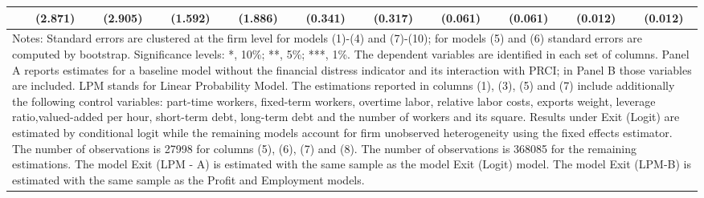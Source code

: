 {\begin{tabular}{l*{10}{c}}
            &     (2.871)         &     (2.905)         &     (1.592)         &     (1.886)         &     (0.341)         &     (0.317)         &     (0.061)         &     (0.061)         &     (0.012)         &     (0.012)         \\\hline
\multicolumn{11}{p{25.0cm}}{\footnotesize Notes: Standard errors are clustered at the firm level for models (1)-(4) and (7)-(10); for models (5) and (6) standard errors are computed by bootstrap. Significance levels: *, 10\%; **, 5\%; ***, 1\%. The dependent variables are identified in each set of columns. Panel A reports estimates for a baseline model without the financial distress indicator and its interaction with PRCI; in Panel B those variables are included.
LPM stands for Linear Probability Model. The estimations reported in columns (1), (3), (5) and (7) include additionally the following control variables: part-time workers, fixed-term workers, overtime labor, relative labor costs, exports weight, leverage ratio,valued-added per hour, short-term debt, long-term debt and the number of workers and its square. Results under Exit (Logit) are estimated by conditional logit while the remaining models account for firm unobserved heterogeneity using the fixed effects estimator. The number of observations is 27998 for columns (5), (6), (7) and (8). The number of observations is 368085 for the remaining estimations. The model Exit (LPM - A) is estimated with the same sample as the model Exit (Logit) model. The model Exit (LPM-B) is estimated with the same sample as the Profit and Employment models.}\\
\end{tabular}
}
